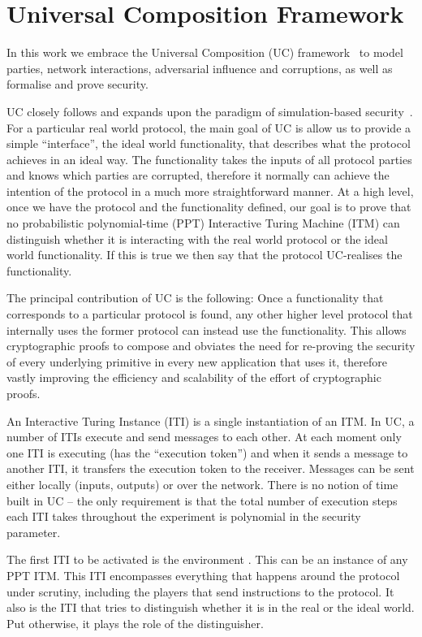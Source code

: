 \section{Universal Composition Framework}
  In this work we embrace the Universal Composition (UC) framework~\cite{uc} to
  model parties, network interactions, adversarial influence and corruptions, as
  well as formalise and prove security.

  UC closely follows and expands upon the paradigm of simulation-based
  security~\cite{DBLP:books/sp/17/Lindell17}. For a particular real world
  protocol, the main goal of UC is allow us to provide a simple ``interface'',
  the ideal world functionality, that describes what the protocol achieves in an
  ideal way. The functionality takes the inputs of all protocol parties and
  knows which parties are corrupted, therefore it normally can achieve the
  intention of the protocol in a much more straightforward manner. At a high
  level, once we have the protocol and the functionality defined, our goal is to
  prove that no probabilistic polynomial-time (PPT) Interactive Turing Machine
  (ITM) can distinguish whether it is interacting with the real world protocol
  or the ideal world functionality. If this is true we then say that the
  protocol UC-realises the functionality.

  The principal contribution of UC is the following: Once a functionality that
  corresponds to a particular protocol is found, any other higher level protocol
  that internally uses the former protocol can instead use the functionality.
  This allows cryptographic proofs to compose and obviates the need for
  re-proving the security of every underlying primitive in every new application
  that uses it, therefore vastly improving the efficiency and scalability of the
  effort of cryptographic proofs.

  An Interactive Turing Instance (ITI) is a single instantiation of an ITM. In
  UC, a number of ITIs execute and send
  messages to each other. At each moment only one ITI is executing (has the
  ``execution token'') and when it sends a message to another ITI, it transfers
  the execution token to the receiver. Messages can be sent either locally
  (inputs, outputs) or over the network. There is no notion of time built in UC
  -- the only requirement is that the total number of execution steps each ITI
  takes throughout the experiment is polynomial in the security parameter.

  The first ITI to be activated is the environment \environment. This can be an
  instance of any
  PPT ITM. This ITI encompasses everything that happens around the protocol
  under scrutiny, including the players that send instructions to the protocol.
  It also is the ITI that tries to distinguish whether it is in the real or the
  ideal world. Put otherwise, it plays the role of the distinguisher.

